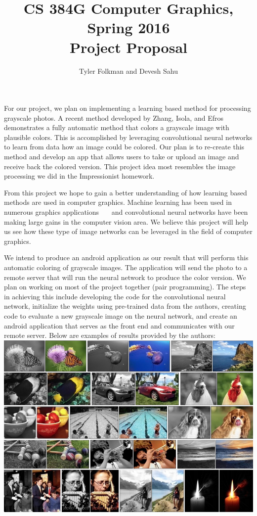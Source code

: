 \documentclass[11pt,letterpaper]{article}
\author{Tyler Folkman and Devesh Sahu}
\title{CS 384G Computer Graphics, Spring 2016 \\ Project Proposal}
\begin{document}
\maketitle

For our project, we plan on implementing a learning based method for processing grayscale photos. A recent method developed by Zhang, Isola, and Efros~\cite{zhang2016colorful} demonstrates a fully automatic method that colors a grayscale image with plausible colors. This is accomplished by leveraging convolutional neural networks to learn from data how an image could be colored. Our plan is to re-create this method and develop an app that allows users to take or upload an image and receive back the colored version. This project idea most resembles the image processing we did in the Impressionist homework.

From this project we hope to gain a better understanding of how learning based methods are used in computer graphics. Machine learning has been used in numerous graphics applications~\cite{grochow2004style}~\cite{barbivc2004segmenting}~\cite{matusik2003data} and convolutional neural networks have been making large gains in the computer vision area. We believe this project will help us see how these type of image networks can be leveraged in the field of computer graphics. 

We intend to produce an android application as our result that will perform this automatic coloring of grayscale images. The application will send the photo to a remote server that will run the neural network to produce the color version. We plan on working on most of the project together (pair programming). The steps in achieving this include developing the code for the convolutional neural network, initialize the weights using pre-trained data from the authors, creating code to evaluate a new grayscale image on the neural network, and create an android application that serves as the front end and communicates with our remote server. Below are examples of results provided by the authors:
\newline
\includegraphics[scale=0.4]{color_examples.png}






\end{document}
